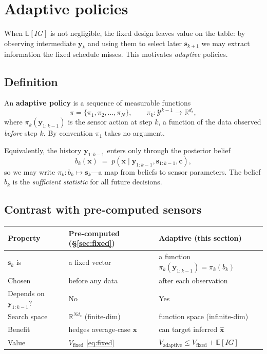 \documentclass[11pt,a4paper]{article}
\newcommand{\R}{\mathbb{R}}
\newcommand{\E}{\mathbb{E}}
\begin{document}
\section{Adaptive policies}
\label{sec:adaptive}

When $\E[IG]$ is not negligible, the fixed design leaves value on the table: by observing intermediate $\bm{y}_k$ and using them to select later $\bm{s}_{k+1}$ we may extract information the fixed schedule misses.  This motivates \emph{adaptive} policies.

\subsection{Definition}

An \textbf{adaptive policy} is a sequence of measurable functions
\begin{equation}
  \pi = \{\pi_1, \pi_2, \ldots, \pi_N\}, \qquad \pi_k: \mathcal{Y}^{k-1} \to \R^{d_s},
\end{equation}
where $\pi_k(\bm{y}_{1:k-1})$ is the sensor action at step $k$, a function of the data observed \emph{before} step $k$.  By convention $\pi_1$ takes no argument.

Equivalently, the history $\bm{y}_{1:k-1}$ enters only through the posterior belief
\begin{equation}
  b_k(\bm{x}) \;=\; p(\bm{x} \mid \bm{y}_{1:k-1}, \bm{s}_{1:k-1}, \bm{c}),
\end{equation}
so we may write $\pi_k: b_k \mapsto \bm{s}_k$---a map from beliefs to sensor parameters.  The belief $b_k$ is the \emph{sufficient statistic} for all future decisions.

\subsection{Contrast with pre-computed sensors}

\begin{center}
\begin{tabular}{@{}lll@{}}
\toprule
Property & Pre-computed (\S\ref{sec:fixed}) & Adaptive (this section) \\
\midrule
$\bm{s}_k$ is & a fixed vector & a function $\pi_k(\bm{y}_{1:k-1}) = \pi_k(b_k)$ \\
Chosen & before any data & after each observation \\
Depends on $\bm{y}_{1:k-1}$? & No & Yes \\
Search space & $\R^{N d_s}$ (finite-dim) & function space (infinite-dim) \\
Benefit & hedges average-case $\bm{x}$ & can target inferred $\hat{\bm{x}}$ \\
Value & $V_{\mathrm{fixed}}$ \eqref{eq:fixed} & $V_{\mathrm{adaptive}} \le V_{\mathrm{fixed}} + \E[IG]$ \\
\bottomrule
\end{tabular}
\end{center}
\end{document}
